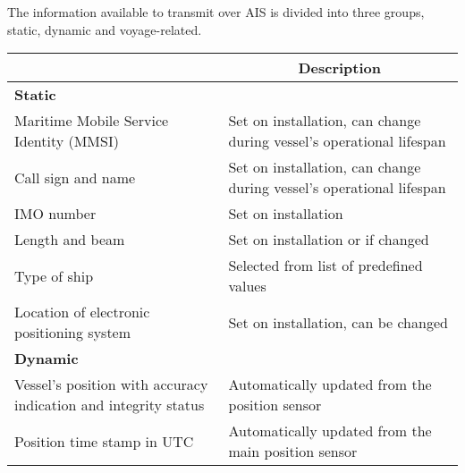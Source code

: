 \documentclass[../main.tex]{subfiles}
\begin{document}
The information available to transmit over AIS is divided into three groups, static, dynamic and voyage-related.

\begin{table}[H]
\centering
\begin{tabular}{|m{5cm}|m{9cm}|}
\hline
\rowcolor[HTML]{C0C0C0} 
\multicolumn{1}{|c|}{\cellcolor[HTML]{C0C0C0}\textbf{Data}}  & \multicolumn{1}{c|}{\cellcolor[HTML]{C0C0C0}\textbf{Description}}                 \\ \hline
\rowcolor[HTML]{C0C0C0} 
\textbf{Static}                                              &                                                                                   \\ \hline
Maritime Mobile Service Identity (MMSI)                      & Set on installation, can change during vessel's operational lifespan               \\ \hline
Call sign and name                                           & Set on installation, can change during vessel's operational lifespan               \\ \hline
IMO number                                                   & Set on installation                                                               \\ \hline
Length and beam                                              & Set on installation or if changed                                                 \\ \hline
Type of ship                                                 & Selected from list of predefined values                                           \\ \hline
Location of electronic positioning system                    & Set on installation, can be changed                                               \\ \hline
\rowcolor[HTML]{C0C0C0} 
\textbf{Dynamic}                                             &                                                                                   \\ \hline
Vessel's position with accuracy indication and integrity status & Automatically updated from the position sensor                                    \\ \hline
Position time stamp in UTC                                   & Automatically updated from the main position sensor                               \\ \hline

\end{tabular}
\end{table}
\end{document}

